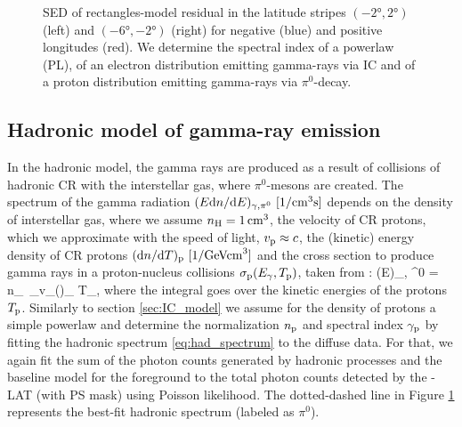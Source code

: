 \begin{figure}[h!]
\begin{subfigure}{0.5\textwidth}
    \end{subfigure}
  	\caption{SED of rectangles-model residual in the latitude stripes $(\ang{-2}, \ang{2})$ (left) and $(\ang{-6}, \ang{-2})$ (right) for negative (blue) and positive longitudes (red). We determine the spectral index of a powerlaw (PL), of an electron distribution emitting gamma-rays via IC and of a proton distribution emitting gamma-rays via $\pi^0$-decay. 
	}
  	\label{fig:SED_with_fits}
\end{figure}



\subsection{Hadronic model of gamma-ray emission}
\label{sec:Pion_model}

In the hadronic model, the gamma rays are produced as a result of collisions of hadronic CR with the interstellar gas, where $\pi^0$-mesons are created.
The spectrum of the gamma radiation $(E \de n / \de E)_{\gamma,\pi^0}\ [\SI{}{1/cm^3s}]$ depends on the density of interstellar gas, where we assume $n_{\text{H}} = \SI{1}{/cm^3}$, the velocity of CR protons, which we approximate with the speed of light, $v_{\text{p}} \approx c$, the (kinetic) energy density of CR protons $(\text{d} n / \text{d} T)_{\text{p}}\ [\SI{}{1/GeVcm^3}]$ and the cross section to produce gamma rays in a proton-nucleus collisions $\sigma_{\text{p}} (E_\gamma, T_{\text{p}})$, taken from :
\be
\left(E\right)_{\!\!\gamma, \pi^0}\! = \int n_\Hy\ \sigma_\pr v_\pr \left(\right)_{\!\!\pr} \de T_\pr,
\label{eq:had_spectrum}
\ee
where the integral goes over the kinetic energies of the protons $T_{\text{p}}$. Similarly to section \ref{sec:IC_model} we assume for the density of protons a simple powerlaw and determine the normalization $n_{\text{p}}$ and spectral index $\gamma_{\text{p}}$  by fitting the hadronic spectrum \eqref{eq:had_spectrum} to the diffuse \Fermi data. For that, we again fit the sum of the photon counts generated by hadronic processes and the baseline model for the foreground to the total photon counts detected by the \Fermi-LAT (with PS mask) using Poisson likelihood.  The dotted-dashed line in Figure \ref{fig:SED_with_fits} represents the best-fit hadronic spectrum (labeled as $\pi^0$).

